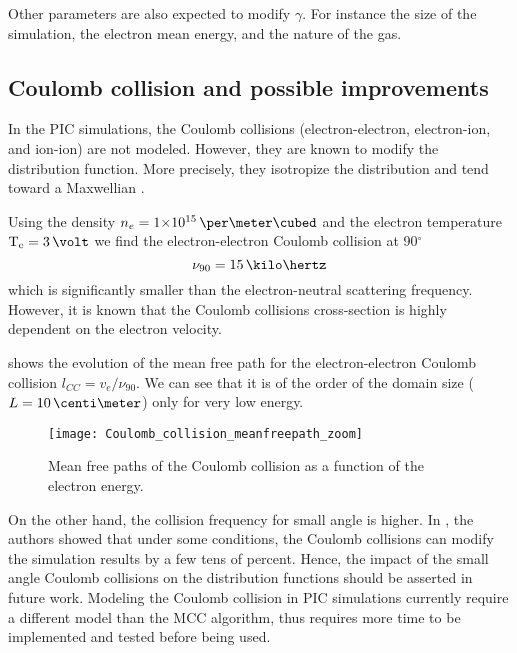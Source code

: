    Other parameters are also expected to modify $\gamma$.
    For instance the size of the simulation, the electron mean energy, and the nature of the gas.

  \subsection{Coulomb collision and possible improvements}
  
    In the \ac{PIC} simulations, the Coulomb collisions (electron-electron, electron-ion, and ion-ion) are not modeled.
    However, they are known to modify the distribution function.
    More precisely, they isotropize the distribution and tend toward a Maxwellian \citep{bhatnagar1954,sydorenko2006b}.
    
     Using the density $n_e=\sn{1}{15}\,\per\meter\cubed$ and the electron temperature $\Te=3\,\volt$ we find the electron-electron Coulomb collision at 90$^{\circ}$ \citep{lieberman2005,chen2006}
     \begin{equation} \label{eq-nu_Coulomb}
       \nu_{90} = 15 \,\kilo\hertz
     \end{equation}
     which is significantly smaller than the electron-neutral scattering frequency.
     However, it is known that the Coulomb collisions cross-section is highly dependent on the electron velocity.
     
      shows the evolution of the mean free path for the electron-electron Coulomb collision $l_{CC} = v_e/\nu_{90}$.
     We can see that it is of the order of the domain size ($L=10\,\centi\meter$) only for very low energy.
     \begin{figure}[!hbt]
       \centering
       \texttt{[image: Coulomb\_collision\_meanfreepath\_zoom]}
       \caption{Mean free paths of the Coulomb collision as a function of the electron energy.}
       \label{fig-mfp_coulomb}
     \end{figure}
     On the other hand, the collision frequency for small angle is higher.
     In \citet{sydorenko2006b}, the authors showed that under some conditions, the Coulomb collisions can modify the simulation results by a few tens of percent.
     Hence, the impact of the small angle Coulomb collisions on the distribution functions should be asserted in future work.
     Modeling the Coulomb collision in \ac{PIC} simulations currently require a different model than the \ac{MCC} algorithm, thus requires more time to be implemented and tested before being used.

     
